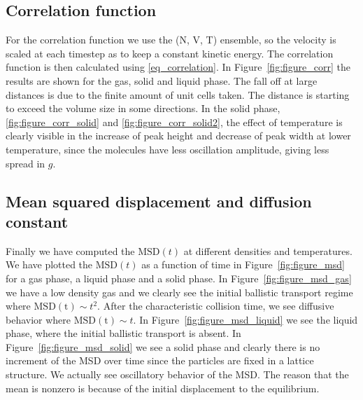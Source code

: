 \documentclass[twoside]{article}
\begin{document}
\subsection{Correlation function}
For the correlation function we use the (N, V, T) ensemble, so the velocity is scaled at each timestep as to keep a constant kinetic energy. The correlation function is then calculated using \eqref{eq_correlation}. In Figure~\ref{fig:figure_corr} the results are shown for the gas, solid and liquid phase. The fall off at large distances is due to the finite amount of unit cells taken. The distance is starting to exceed the volume size in some directions. In the solid phase, \ref{fig:figure_corr_solid} and \ref{fig:figure_corr_solid2}, the effect of temperature is clearly visible in the increase of peak height and decrease of peak width at lower temperature, since the molecules have less oscillation amplitude, giving less spread in $g$. 


\subsection{Mean squared displacement and diffusion constant}
Finally we have computed the $\mathrm{MSD}(t)$ at different densities and temperatures. We have plotted the $\mathrm{MSD}(t)$ as a function of time in Figure~\ref{fig:figure_msd} for a gas phase, a liquid phase and a solid phase. In Figure~\ref{fig:figure_msd_gas} we have a low density gas and we clearly see the initial ballistic transport regime where $\mathrm{MSD(t)} \sim t^2$. After the characteristic collision time, we see diffusive behavior where $\mathrm{MSD(t)} \sim t$. In Figure~\ref{fig:figure_msd_liquid} we see the liquid phase, where the initial ballistic transport is absent. In Figure~\ref{fig:figure_msd_solid} we see a solid phase and clearly there is no increment of the MSD over time since the particles are fixed in a lattice structure. We actually see oscillatory behavior of the MSD. The reason that the mean is nonzero is because of the initial displacement to the equilibrium.
\end{document}
